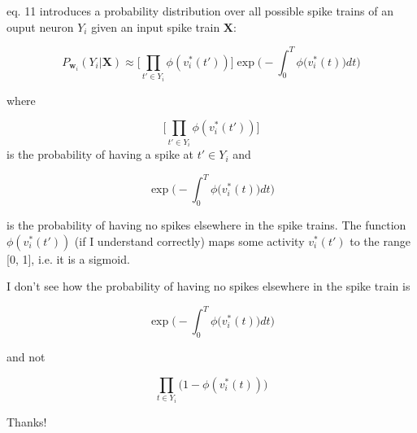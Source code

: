 \documentclass[11pt, oneside]{article}   	%
\begin{document}
eq. 11 introduces a probability distribution over all possible spike trains of an ouput neuron $Y_i$ given an input spike train $\mathbf X$:

$$
P_{\mathbf w_{i}}(Y_i|\mathbf X) \approx \Bigg [\prod_{t' \in Y_i} \phi(v_i^*(t')) \Bigg ] \exp \Bigg(-\int_0^T \phi \Big(v_i^*(t)\Big) dt \Bigg)
$$

where

$$
\Bigg [\prod_{t' \in Y_i} \phi(v_i^*(t')) \Bigg ]
$$
is the probability of having a spike at $t' \in Y_i$ and  

$$
\exp \Bigg(-\int_0^T \phi \Big(v_i^*(t)\Big) dt \Bigg)
$$


is the probability of having no spikes elsewhere in the spike trains. The function $\phi(v_i^*(t'))$ (if I understand correctly) maps some activity $v_i^*(t')$ to the range [0, 1], i.e. it is a sigmoid. 



I don't see how the probability of having no spikes elsewhere in the spike train is 

$$\exp \Bigg(-\int_0^T \phi \Big(v_i^*(t)\Big) dt \Bigg)$$ 

and not 

$$\prod_{t \in Y_i} \big(1 - \phi(v_i^*(t))\big)$$

Thanks!
\end{document}
